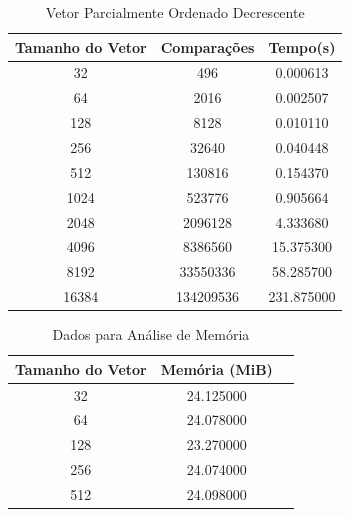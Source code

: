 \documentclass[12pt,a4paper,twoside]{report}
\begin{document}
\begin{table}[h]
  \centering
  \caption{Vetor Parcialmente Ordenado Decrescente \label{tab:pod}}
  \begin{tabular}{ccc} \\\hline
  \textbf{Tamanho do Vetor} & \textbf{Comparações} & \textbf{Tempo(s)} \\\hline
  32                        & 496                  & 0.000613          \\\hline
  64                        & 2016                 & 0.002507          \\\hline
  128                       & 8128                 & 0.010110          \\\hline
  256                       & 32640                & 0.040448          \\\hline
  512                       & 130816               & 0.154370          \\\hline
  1024                      & 523776               & 0.905664          \\\hline
  2048                      & 2096128              & 4.333680          \\\hline
  4096                      & 8386560              & 15.375300         \\\hline
  8192                      & 33550336             & 58.285700        \\\hline
  16384                     & 134209536            & 231.875000        \\\hline
  \end{tabular}
\end{table}

\begin{table}[h]
  \centering
  \caption{Dados para Análise de Memória \label{tab:memoria}}
  \begin{tabular}{ccc} \\\hline
  \textbf{Tamanho do Vetor} & \textbf{Memória (MiB)} \\\hline
  32                        & 24.125000                  \\\hline
  64                        & 24.078000            \\\hline
  128                       & 23.270000            \\\hline
  256                       & 24.074000            \\\hline
  512                       & 24.098000            \\\hline
  \end{tabular}
\end{table}
\end{document}
